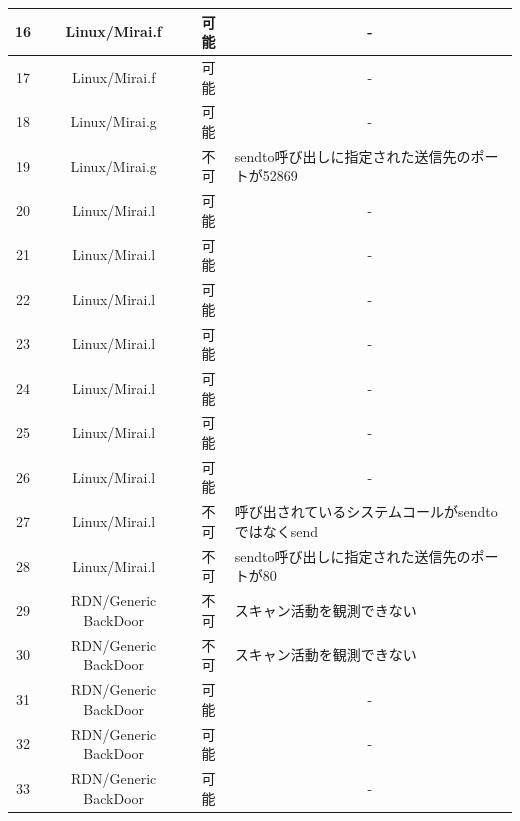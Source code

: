 \begin{small}
\begin{longtable}{|c|c|c|l|}
        16 & Linux/Mirai.f        & 可能    & \multicolumn{1}{c|}{-}                             \\ \hline
        17 & Linux/Mirai.f        & 可能    & \multicolumn{1}{c|}{-}                             \\ \hline
        18 & Linux/Mirai.g        & 可能    & \multicolumn{1}{c|}{-}                             \\ \hline
        19 & Linux/Mirai.g        & 不可    & sendto呼び出しに指定された送信先のポートが52869 \\ \hline
        20 & Linux/Mirai.l        & 可能    & \multicolumn{1}{c|}{-}                             \\ \hline
        21 & Linux/Mirai.l        & 可能    & \multicolumn{1}{c|}{-}                             \\ \hline
        22 & Linux/Mirai.l        & 可能    & \multicolumn{1}{c|}{-}                             \\ \hline
        23 & Linux/Mirai.l        & 可能    & \multicolumn{1}{c|}{-}                             \\ \hline
        24 & Linux/Mirai.l        & 可能    & \multicolumn{1}{c|}{-}                             \\ \hline
        25 & Linux/Mirai.l        & 可能    & \multicolumn{1}{c|}{-}                             \\ \hline
        26 & Linux/Mirai.l       
         & 可能    & \multicolumn{1}{c|}{-}                             \\ \hline
        27 & Linux/Mirai.l        & 不可    & 呼び出されているシステムコールがsendtoではなくsend       \\ \hline
        28 & Linux/Mirai.l        & 不可    & sendto呼び出しに指定された送信先のポートが80    \\ \hline
        29 & RDN/Generic BackDoor & 不可    & スキャン活動を観測できない                 \\ \hline
        30 & RDN/Generic BackDoor & 不可    & スキャン活動を観測できない\\ \hline
        31 & RDN/Generic BackDoor & 可能    & \multicolumn{1}{c|}{-}                             \\ \hline
        32 & RDN/Generic BackDoor & 可能    & \multicolumn{1}{c|}{-}                             \\ \hline
        33 & RDN/Generic BackDoor & 可能    & \multicolumn{1}{c|}{-}                             \\ \hline

\end{longtable}
\end{small}
